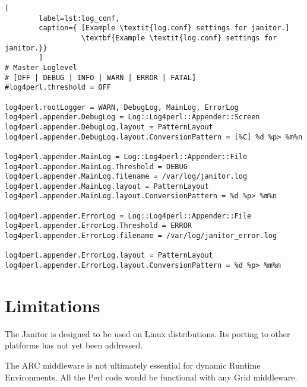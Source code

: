 \begin{lstlisting}[
        label=lst:log_conf,
        caption={ [Example \textit{log.conf} settings for janitor.]
                  \textbf{Example \textit{log.conf} settings for janitor.}}
        ]
# Master Loglevel
# [OFF | DEBUG | INFO | WARN | ERROR | FATAL]
#log4perl.threshold = OFF

log4perl.rootLogger = WARN, DebugLog, MainLog, ErrorLog
log4perl.appender.DebugLog = Log::Log4perl::Appender::Screen
log4perl.appender.DebugLog.layout = PatternLayout
log4perl.appender.DebugLog.layout.ConversionPattern = [%C] %d %p> %m%n

log4perl.appender.MainLog = Log::Log4perl::Appender::File
log4perl.appender.MainLog.Threshold = DEBUG
log4perl.appender.MainLog.filename = /var/log/janitor.log
log4perl.appender.MainLog.layout = PatternLayout
log4perl.appender.MainLog.layout.ConversionPattern = %d %p> %m%n

log4perl.appender.ErrorLog = Log::Log4perl::Appender::File
log4perl.appender.ErrorLog.Threshold = ERROR
log4perl.appender.ErrorLog.filename = /var/log/janitor_error.log

log4perl.appender.ErrorLog.layout = PatternLayout
log4perl.appender.ErrorLog.layout.ConversionPattern = %d %p> %m%n
\end{lstlisting}



\section{Limitations}

The Janitor is designed to be used on Linux distributions.
Its porting to other platforms has not yet been addressed.

The ARC middleware is not ultimately essential for dynamic Runtime Environments.
All the Perl code would be functional with any Grid middleware.


